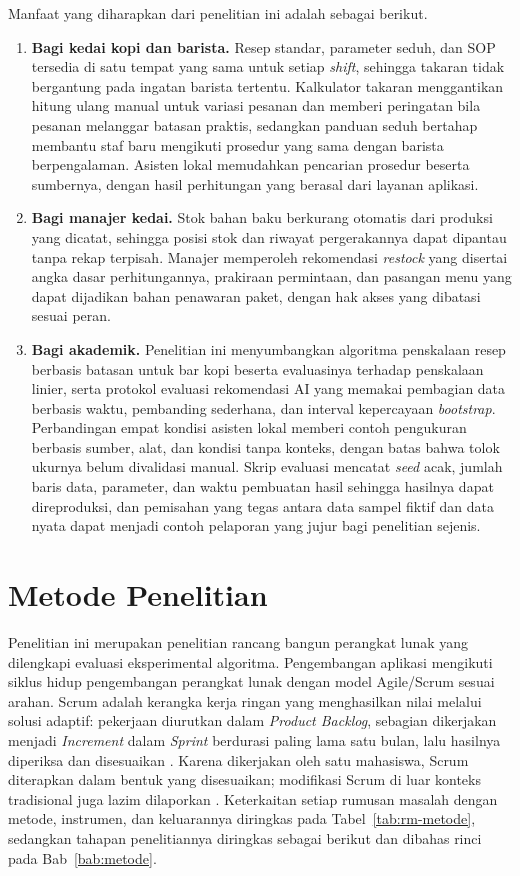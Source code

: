 Manfaat yang diharapkan dari penelitian ini adalah sebagai berikut.

\begin{enumerate}[label=\arabic*.]
\item \textbf{Bagi kedai kopi dan barista.} Resep standar, parameter seduh, dan SOP tersedia di satu tempat yang sama untuk setiap \textit{shift}, sehingga takaran tidak bergantung pada ingatan barista tertentu. Kalkulator takaran menggantikan hitung ulang manual untuk variasi pesanan dan memberi peringatan bila pesanan melanggar batasan praktis, sedangkan panduan seduh bertahap membantu staf baru mengikuti prosedur yang sama dengan barista berpengalaman. Asisten lokal memudahkan pencarian prosedur beserta sumbernya, dengan hasil perhitungan yang berasal dari layanan aplikasi.
\item \textbf{Bagi manajer kedai.} Stok bahan baku berkurang otomatis dari produksi yang dicatat, sehingga posisi stok dan riwayat pergerakannya dapat dipantau tanpa rekap terpisah. Manajer memperoleh rekomendasi \textit{restock} yang disertai angka dasar perhitungannya, prakiraan permintaan, dan pasangan menu yang dapat dijadikan bahan penawaran paket, dengan hak akses yang dibatasi sesuai peran.
\item \textbf{Bagi akademik.} Penelitian ini menyumbangkan algoritma penskalaan resep berbasis batasan untuk bar kopi beserta evaluasinya terhadap penskalaan linier, serta protokol evaluasi rekomendasi AI yang memakai pembagian data berbasis waktu, pembanding sederhana, dan interval kepercayaan \textit{bootstrap}. Perbandingan empat kondisi asisten lokal memberi contoh pengukuran berbasis sumber, alat, dan kondisi tanpa konteks, dengan batas bahwa tolok ukurnya belum divalidasi manual. Skrip evaluasi mencatat \textit{seed} acak, jumlah baris data, parameter, dan waktu pembuatan hasil sehingga hasilnya dapat direproduksi, dan pemisahan yang tegas antara data sampel fiktif dan data nyata dapat menjadi contoh pelaporan yang jujur bagi penelitian sejenis.
\end{enumerate}

\section{Metode Penelitian}
\label{sec:metode-ringkas}

Penelitian ini merupakan penelitian rancang bangun perangkat lunak yang dilengkapi evaluasi eksperimental algoritma. Pengembangan aplikasi mengikuti siklus hidup pengembangan perangkat lunak dengan model Agile/Scrum sesuai arahan. Scrum adalah kerangka kerja ringan yang menghasilkan nilai melalui solusi adaptif: pekerjaan diurutkan dalam \textit{Product Backlog}, sebagian dikerjakan menjadi \textit{Increment} dalam \textit{Sprint} berdurasi paling lama satu bulan, lalu hasilnya diperiksa dan disesuaikan \citep*{schwaber2020scrum}. Karena dikerjakan oleh satu mahasiswa, Scrum diterapkan dalam bentuk yang disesuaikan; modifikasi Scrum di luar konteks tradisional juga lazim dilaporkan \citep*{hron2022why}. Keterkaitan setiap rumusan masalah dengan metode, instrumen, dan keluarannya diringkas pada Tabel~\ref{tab:rm-metode}, sedangkan tahapan penelitiannya diringkas sebagai berikut dan dibahas rinci pada Bab~\ref{bab:metode}.

